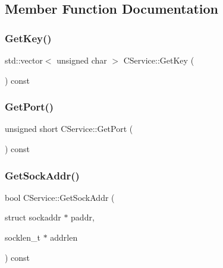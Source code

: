 \subsection{Member Function Documentation}
\mbox{\label{class_c_service_af21ea7db4318330b337c8bfdcc55aff0}} 
\subsubsection{\texorpdfstring{Get\+Key()}{GetKey()}}
{\footnotesize\ttfamily std\+::vector$<$ unsigned char $>$ C\+Service\+::\+Get\+Key (\begin{DoxyParamCaption}{ }\end{DoxyParamCaption}) const}

\mbox{\label{class_c_service_a71caa0d6aa6ab12758bde8b6a6bcfd2a}} 
\subsubsection{\texorpdfstring{Get\+Port()}{GetPort()}}
{\footnotesize\ttfamily unsigned short C\+Service\+::\+Get\+Port (\begin{DoxyParamCaption}{ }\end{DoxyParamCaption}) const}

\mbox{\label{class_c_service_ac4c6d655fab3af40937f0b0c65581745}} 
\subsubsection{\texorpdfstring{Get\+Sock\+Addr()}{GetSockAddr()}}
{\footnotesize\ttfamily bool C\+Service\+::\+Get\+Sock\+Addr (\begin{DoxyParamCaption}\item[{struct sockaddr $\ast$}]{paddr,  }\item[{socklen\+\_\+t $\ast$}]{addrlen }\end{DoxyParamCaption}) const}

\mbox{\label{class_c_service_aee07d7f18e672f16d26359e3cab779ff}} 
